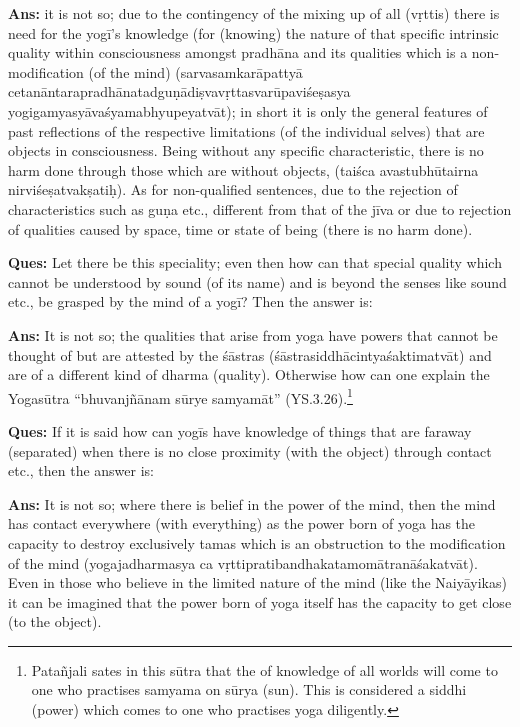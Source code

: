 \textbf{Ans:} it is not so; due to the contingency of the mixing up of all (vṛttis) there is need for the yogī’s knowledge (for (knowing) the nature of that specific intrinsic quality within consciousness amongst pradhāna and its qualities which is a non-modification (of the mind) (sarvasamkarāpattyā cetanāntarapradhānatadguṇādiṣvavṛttasvarūpaviśeṣasya yogi\-gamyasyāvaśyamabhyupeyatvāt); in short it is only the general features of past reflections of the respective limitations (of the individual selves) that are objects in consciousness. Being without any specific characteristic, there is no harm done through those which are without objects, (taiśca avastubhūtairna nirviśeṣatvakṣatiḥ). As for non-qualified sentences, due to the rejection of characteristics such as guṇa etc., different from that of the jīva or due to rejection of qualities caused by space, time or state of being (there is no harm done).

\textbf{Ques:}  Let there be this speciality; even then how can that special quality which cannot be understood by sound (of its name) and is beyond the senses like sound etc., be grasped by the mind of a yogī? Then the answer is: 

\textbf{Ans:} It is not so; the qualities that arise from yoga have powers that cannot be thought of but are attested by the śāstras (śāstrasiddhācintyaśaktimatvāt) and are of a different kind of dharma (quality). Otherwise how can one explain the Yogasūtra “bhuvanjñānam sūrye samyamāt” (YS.3.26).\footnote{Patañjali sates in this sūtra that the of knowledge of all worlds will come to one who practises samyama on sūrya (sun). This is considered a siddhi (power) which comes to one who practises yoga diligently.} 

\textbf{Ques:} If it is said how can yogīs have knowledge of things that are faraway (separated) when there is no close proximity (with the object) through contact etc., then the answer is: 

\textbf{Ans:} It is not so; where there is belief in the power of the mind, then the mind has contact everywhere (with everything) as the power born of yoga has the capacity to destroy exclusively tamas which is an obstruction to the modification of the mind (yogajadharmasya ca vṛttipratibandhakatamomātranāśakatvāt). Even in those who believe in the limited nature of the mind (like the Naiyāyikas) it can be imagined that the power born of yoga itself has the capacity to get close (to the object).


